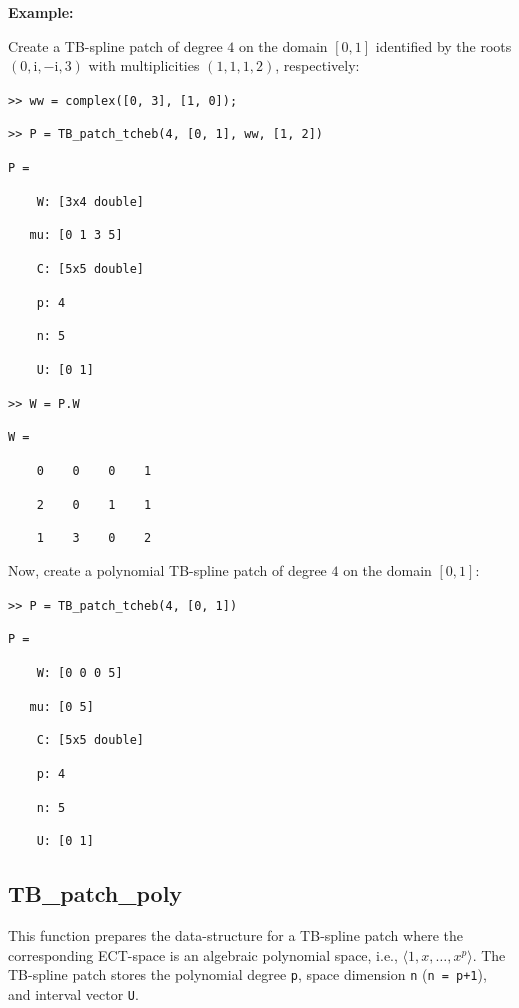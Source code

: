 \documentclass[10pt]{acmtrans2e}
\newenvironment{example}
{\vspace*{0.1cm}
\noindent \textbf{Example:} \vspace*{0.15cm}

\setlength{\parskip}{0.5ex plus 0.5exminus 0.2 ex}
}
{\medskip
}
\begin{document}
\begin{example}
\noindent Create a TB-spline patch of degree $4$ on the domain $[0,1]$ identified by the roots $(0,\mathrm{i},-\mathrm{i},3)$ with multiplicities $(1,1,1,2)$, respectively: 
\medskip

\texttt{>> ww = complex([0, 3], [1, 0]);}

\texttt{>> P = TB\_patch\_tcheb(4, [0, 1], ww, [1, 2])}

\texttt{P = }

\texttt{\ \ \ \ W:\ [3x4 double]}

\texttt{\ \ \  mu:\ [0 1 3 5]}

\texttt{\ \ \ \ C:\ [5x5 double]}

\texttt{\ \ \ \ p:\ 4}

\texttt{\ \ \ \ n:\ 5}

\texttt{\ \ \ \ U:\ [0 1]}

\texttt{>> W = P.W}

\pagebreak

\texttt{W = }

\texttt{\ \ \ \ 0\ \ \ \ 0\ \ \ \ 0\ \ \ \ 1}

\texttt{\ \ \ \ 2\ \ \ \ 0\ \ \ \ 1\ \ \ \ 1}

\texttt{\ \ \ \ 1\ \ \ \ 3\ \ \ \ 0\ \ \ \ 2}

\medskip
\noindent Now, create a polynomial TB-spline patch of degree $4$ on the domain $[0,1]$:
\medskip

\texttt{>> P = TB\_patch\_tcheb(4, [0, 1])}

\texttt{P = }

\texttt{\ \ \ \ W:\ [0 0 0 5]}

\texttt{\ \ \  mu:\ [0 5]}

\texttt{\ \ \ \ C:\ [5x5 double]}

\texttt{\ \ \ \ p:\ 4}

\texttt{\ \ \ \ n:\ 5}

\texttt{\ \ \ \ U:\ [0 1]}
\end{example}


\subsection{TB\_patch\_poly} \label{sec:matlab-tb-patch-poly}

This function prepares the data-structure for a TB-spline patch where the corresponding ECT-space is an algebraic polynomial space, i.e., $\langle 1, x, \ldots, x^p\rangle$. The TB-spline patch stores the polynomial degree \texttt{p}, space dimension \texttt{n} (\texttt{n = p+1}), and interval vector \texttt{U}.
\end{document}
